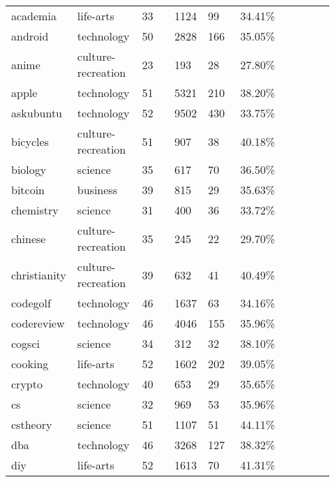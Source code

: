 \begin{longtabu}{@{}
	p{0.17\linewidth}
	p{0.2\linewidth}
	P{0.1\linewidth}
	P{0.1\linewidth}
	P{0.1\linewidth}
	P{0.1\linewidth}
	p{0.15\linewidth}@{}}
academia         & life-arts          & 33    & 1124             & 99      & 34.41\%     \\
android          & technology         & 50    & 2828             & 166     & 35.05\%     \\
anime            & culture-recreation & 23    & 193              & 28      & 27.80\%     \\
apple            & technology         & 51    & 5321             & 210     & 38.20\%     \\
askubuntu        & technology         & 52    & 9502             & 430     & 33.75\%     \\
bicycles         & culture-recreation & 51    & 907              & 38      & 40.18\%     \\
biology          & science            & 35    & 617              & 70      & 36.50\%     \\
bitcoin          & business           & 39    & 815              & 29      & 35.63\%     \\
chemistry        & science            & 31    & 400              & 36      & 33.72\%     \\
chinese          & culture-recreation & 35    & 245              & 22      & 29.70\%     \\
christianity     & culture-recreation & 39    & 632              & 41      & 40.49\%     \\
codegolf         & technology         & 46    & 1637             & 63      & 34.16\%     \\
codereview       & technology         & 46    & 4046             & 155     & 35.96\%     \\
cogsci           & science            & 34    & 312              & 32      & 38.10\%     \\
cooking          & life-arts          & 52    & 1602             & 202     & 39.05\%     \\
crypto           & technology         & 40    & 653              & 29      & 35.65\%     \\
cs               & science            & 32    & 969              & 53      & 35.96\%     \\
cstheory         & science            & 51    & 1107             & 51      & 44.11\%     \\
dba              & technology         & 46    & 3268             & 127     & 38.32\%     \\
diy              & life-arts          & 52    & 1613             & 70      & 41.31\%     \\

\end{longtabu}
